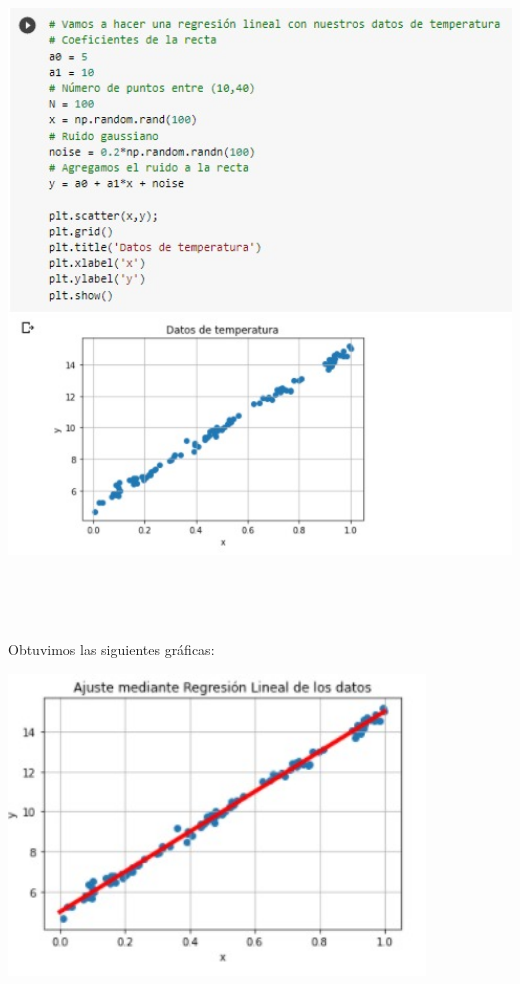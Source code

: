 \documentclass[12pt]{article}
\begin{document}
    \begin{center}
	\includegraphics[height=18cm]{E6.1.jpeg}\\
    \end{center}
    
    Obtuvimos las siguientes gráficas:
    
    \begin{center}
	\includegraphics[height=8cm]{E6.2.jpeg}\\
    \end{center}
 
\end{document}
